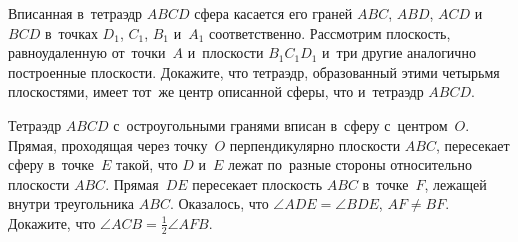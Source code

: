 \begin{problems}
\item
Вписанная в~тетраэдр $ABCD$ сфера касается его
граней $ABC$, $ABD$, $ACD$ и~$BCD$ в~точках $D_{1}$, $C_{1}$, $B_{1}$ и~$A_{1}$
соответственно.
Рассмотрим плоскость, равноудаленную от~точки~$A$ и~плоскости $B_{1}C_{1}D_{1}$
и~три другие аналогично построенные плоскости.
Докажите, что тетраэдр, образованный этими четырьмя плоскостями, имеет тот~же
центр описанной сферы, что и~тетраэдр $ABCD$.

\item
Тетраэдр $ABCD$ с~остроугольными гранями вписан в~сферу с~центром~$O$.
Прямая, проходящая через точку~$O$ перпендикулярно плоскости $ABC$, пересекает
сферу в~точке~$E$ такой, что $D$ и~$E$ лежат по~разные стороны относительно
плоскости $ABC$.
Прямая~$DE$ пересекает плоскость $ABC$ в~точке~$F$, лежащей внутри
треугольника $ABC$.
Оказалось, что $\angle ADE = \angle BDE$, $AF \neq BF$.
Докажите, что $\angle ACB = \frac{1}{2} \angle AFB$.

\end{problems}

